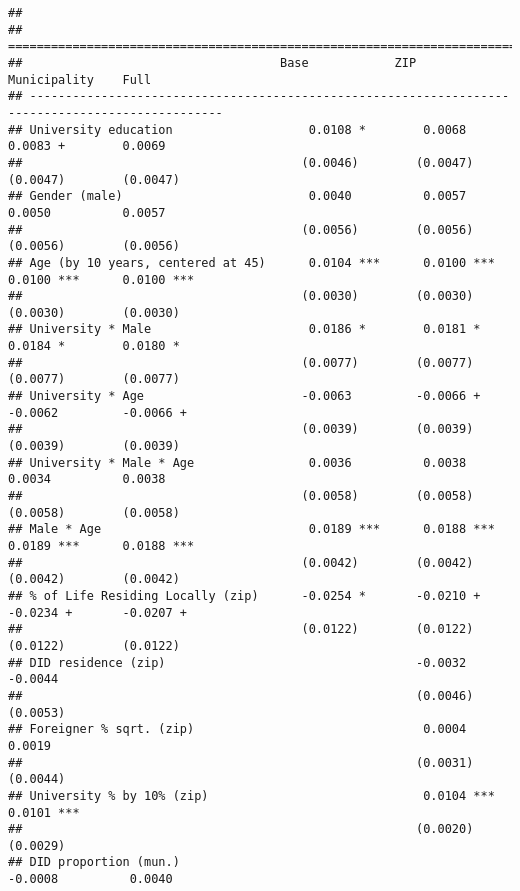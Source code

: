 \documentclass[
]{article}
\begin{document}
\begin{verbatim}
## 
## =================================================================================================
##                                    Base            ZIP             Municipality    Full          
## -------------------------------------------------------------------------------------------------
## University education                   0.0108 *        0.0068          0.0083 +        0.0069    
##                                       (0.0046)        (0.0047)        (0.0047)        (0.0047)   
## Gender (male)                          0.0040          0.0057          0.0050          0.0057    
##                                       (0.0056)        (0.0056)        (0.0056)        (0.0056)   
## Age (by 10 years, centered at 45)      0.0104 ***      0.0100 ***      0.0100 ***      0.0100 ***
##                                       (0.0030)        (0.0030)        (0.0030)        (0.0030)   
## University * Male                      0.0186 *        0.0181 *        0.0184 *        0.0180 *  
##                                       (0.0077)        (0.0077)        (0.0077)        (0.0077)   
## University * Age                      -0.0063         -0.0066 +       -0.0062         -0.0066 +  
##                                       (0.0039)        (0.0039)        (0.0039)        (0.0039)   
## University * Male * Age                0.0036          0.0038          0.0034          0.0038    
##                                       (0.0058)        (0.0058)        (0.0058)        (0.0058)   
## Male * Age                             0.0189 ***      0.0188 ***      0.0189 ***      0.0188 ***
##                                       (0.0042)        (0.0042)        (0.0042)        (0.0042)   
## % of Life Residing Locally (zip)      -0.0254 *       -0.0210 +       -0.0234 +       -0.0207 +  
##                                       (0.0122)        (0.0122)        (0.0122)        (0.0122)   
## DID residence (zip)                                   -0.0032                         -0.0044    
##                                                       (0.0046)                        (0.0053)   
## Foreigner % sqrt. (zip)                                0.0004                          0.0019    
##                                                       (0.0031)                        (0.0044)   
## University % by 10% (zip)                              0.0104 ***                      0.0101 ***
##                                                       (0.0020)                        (0.0029)   
## DID proportion (mun.)                                                 -0.0008          0.0040    

\end{verbatim}
\end{document}
